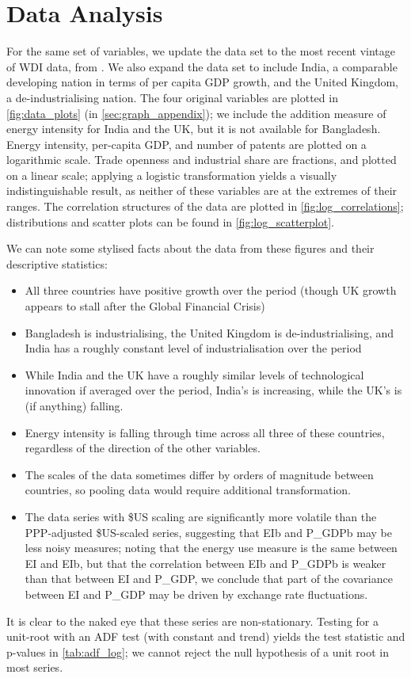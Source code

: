 \documentclass[11pt,a4paper]{article}
\begin{document}
\section{Data Analysis}\label{sec:data_analysis}
For the same set of variables, we update the data set to the most recent vintage of WDI data, from \cite{theworldbankWorldDevelopmentIndicators2019}.
We also expand the data set to include India, a comparable developing nation in terms of per capita GDP growth, and the United Kingdom, a de-industrialising nation.
The four original variables are plotted in \cref{fig:data_plots} (in \cref{sec:graph_appendix}); we include the addition measure of energy intensity for India and the UK, but it is not available for Bangladesh.
Energy intensity, per-capita GDP, and number of patents are plotted on a logarithmic scale.
Trade openness and industrial share are fractions, and plotted on a linear scale; applying a logistic transformation yields a visually indistinguishable result, as neither of these variables are at the extremes of their ranges.
The correlation structures of the data are plotted in \cref{fig:log_correlations}; distributions and scatter plots can be found in \cref{fig:log_scatterplot}.

We can note some stylised facts about the data from these figures and their descriptive statistics:
\begin{itemize}

\item All three countries have positive growth over the period (though UK growth appears to stall  after the Global Financial Crisis)
\item Bangladesh is industrialising, the United Kingdom is de-industrialising, and India has a roughly constant level of industrialisation over the period
\item While India and the UK have a roughly similar levels of technological innovation if averaged over the period, India's is increasing, while the UK's is (if anything) falling.
\item Energy intensity is falling through time across all three of these countries, regardless of the direction of the other variables.
\item The scales of the data sometimes differ by orders of magnitude between countries, so pooling data would require additional transformation.
\item The data series with \$US scaling are significantly more volatile than the PPP-adjusted \$US-scaled series, suggesting that EIb and P\_GDPb may be less noisy measures; noting that the energy use measure is the same between EI and EIb, but that the correlation between EIb and P\_GDPb is weaker than that between EI and P\_GDP, we conclude that part of the covariance between EI and P\_GDP may be driven by exchange rate fluctuations.
\end{itemize}
It is clear to the naked eye that these series are non-stationary.
Testing for a unit-root with an ADF test (with constant and trend) yields the test statistic and p-values in \cref{tab:adf_log}; we cannot reject the null hypothesis of a unit root in most series.
\end{document}

